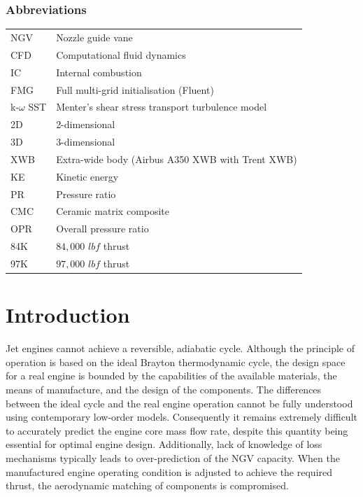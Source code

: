 \documentclass[a4paper, 11pt, oneside]{report}
\begin{document}
\subsection*{Abbreviations}
\begin{table}[H]
\begin{center}
\begin{tabular}{ll}
NGV & Nozzle guide vane \\
CFD & Computational fluid dynamics \\
IC & Internal combustion \\
FMG & Full multi-grid initialisation (Fluent) \\
k-$\omega$ SST & Menter's shear stress transport turbulence model \\
2D & 2-dimensional \\
3D & 3-dimensional \\
XWB & Extra-wide body (Airbus A350 XWB with Trent XWB) \\
KE & Kinetic energy \\
PR & Pressure ratio \\
CMC & Ceramic matrix composite \\
OPR & Overall pressure ratio \\
84K & $84,000$ $lbf$ thrust \\
97K & $97,000$ $lbf$ thrust
\end{tabular}
\end{center}
\end{table}



\chapter{Introduction}
\label{chapter_introduction}



Jet engines cannot achieve a reversible, adiabatic cycle. Although the principle of operation is based on the ideal Brayton thermodynamic cycle, the design space for a real engine is bounded by the capabilities of the available materials, the means of manufacture, and the design of the components. The differences between the ideal cycle and the real engine operation cannot be fully understood using contemporary low-order models. Consequently it remains extremely difficult to accurately predict the engine core mass flow rate, despite this quantity being essential for optimal engine design. Additionally, lack of knowledge of loss mechanisms typically leads to over-prediction of the NGV capacity. When the manufactured engine operating condition is adjusted to achieve the required thrust, the aerodynamic matching of components is compromised.
\end{document}
